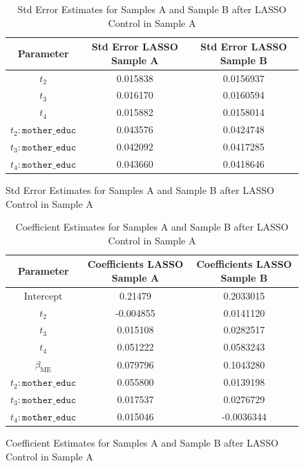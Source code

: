 \documentclass{article}
\begin{document}
\begin{figure}[H]
  \begin{table}[H]
  \centering
  \begin{tabular}{|c|cc|}
    \hline
    Parameter                   & Std Error LASSO Sample A & Std Error LASSO Sample B \\
    \hline
    $t_2$                       & 0.015838        & 0.0156937 \\
    $t_3$                       & 0.016170        & 0.0160594 \\
    $t_4$                       & 0.015882        & 0.0158014 \\
    $t_2:\texttt{mother\_educ}$ & 0.043576        & 0.0424748 \\
    $t_3:\texttt{mother\_educ}$ & 0.042092        & 0.0417285 \\
    $t_4:\texttt{mother\_educ}$ & 0.043660        & 0.0418646 \\
    \hline
  \end{tabular}
  \caption{Std Error Estimates for Samples A and Sample B after LASSO Control in Sample A}
\end{table}
\end{figure}

\begin{figure}[H]
  \begin{table}[H]
  \centering
  \begin{tabular}{|c|cc|}
    \hline
    Parameter                   & Coefficients LASSO Sample A & Coefficients LASSO Sample B \\
    \hline
    $\text{Intercept}$          &  0.21479 & 0.2033015  \\
    $t_2$                       &  -0.004855 & 0.0141120  \\
    $t_3$                       &  0.015108 & 0.0282517  \\
    $t_4$                       &  0.051222 & 0.0583243  \\
    $\beta_{\text{ME}}$         &  0.079796 & 0.1043280  \\
    $t_2:\texttt{mother\_educ}$ &  0.055800 & 0.0139198  \\
    $t_3:\texttt{mother\_educ}$ &  0.017537 & 0.0276729  \\
    $t_4:\texttt{mother\_educ}$ &  0.015046 & -0.0036344 \\
    \hline
  \end{tabular}
  \caption{Coefficient Estimates for Samples A and Sample B after LASSO Control in Sample A}
\end{table}
\end{figure}
\end{document}
